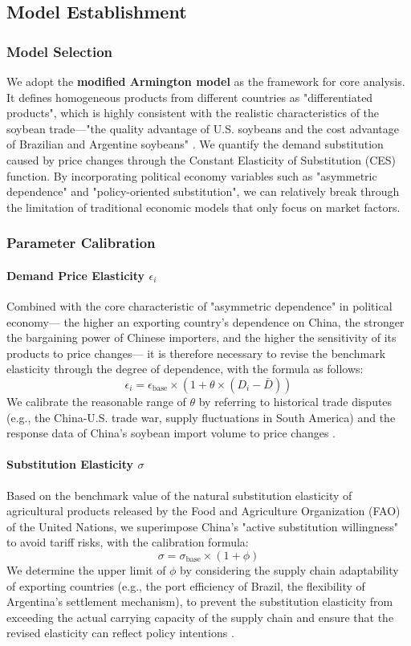\documentclass{apmcmthesis}
\begin{document}
\subsection{Model Establishment}
\subsubsection{Model Selection}
We adopt the \textbf{modified Armington model} as the framework for core analysis. 
It defines homogeneous products from different countries as "differentiated products", which is highly consistent with the realistic characteristics of the soybean trade—"the quality advantage of U.S. soybeans and the cost advantage of Brazilian and Argentine soybeans" \cite{usda2025oilseeds}. 
We quantify the demand substitution caused by price changes through the Constant Elasticity of Substitution (CES) function. 
By incorporating political economy variables such as "asymmetric dependence" and "policy-oriented substitution", we can relatively break through the limitation of traditional economic models that only focus on market factors.

\subsubsection{Parameter Calibration}
\paragraph{Demand Price Elasticity $\epsilon_i$}
Combined with the core characteristic of "asymmetric dependence" in political economy— the higher an exporting country's dependence on China, the stronger the bargaining power of Chinese importers, and the higher the sensitivity of its products to price changes— it is therefore necessary to revise the benchmark elasticity through the degree of dependence, with the formula as follows:
\[
\epsilon_i = \epsilon_{\text{base}} \times (1 + \theta \times (D_i - \bar{D}))
\]
We calibrate the reasonable range of $\theta$ by referring to historical trade disputes (e.g., the China-U.S. trade war, supply fluctuations in South America) and the response data of China's soybean import volume to price changes \cite{usitc2025data}.

\paragraph{Substitution Elasticity $\sigma$}
Based on the benchmark value of the natural substitution elasticity of agricultural products released by the Food and Agriculture Organization (FAO) of the United Nations, we superimpose China's "active substitution willingness" to avoid tariff risks, with the calibration formula:
\[
\sigma = \sigma_{\text{base}} \times (1 + \phi)
\]
We determine the upper limit of $\phi$ by considering the supply chain adaptability of exporting countries (e.g., the port efficiency of Brazil, the flexibility of Argentina's settlement mechanism), to prevent the substitution elasticity from exceeding the actual carrying capacity of the supply chain and ensure that the revised elasticity can reflect policy intentions \cite{fao2025stat}.
\end{document}
